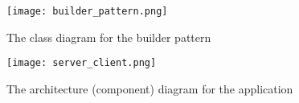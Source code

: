 \documentclass{article}
\begin{document}
\begin{figure}
    \centering
    \texttt{[image: builder\_pattern.png]}
    \caption{The class diagram for the builder pattern}
    \label{fig:builder_dp}
\end{figure}

\begin{figure}
    \centering
    \texttt{[image: server\_client.png]}
    \caption{The architecture (component) diagram for the application}
    \label{fig:builder_dp}
\end{figure}
\end{document}
